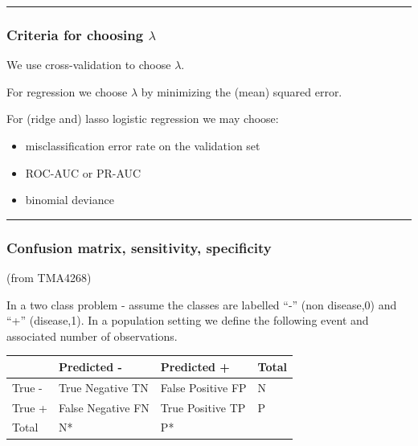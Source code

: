 \documentclass[
  letterpaper,
  DIV=11,
  numbers=noendperiod]{scrartcl}
\providecommand{\tightlist}{%
  \setlength{\itemsep}{0pt}\setlength{\parskip}{0pt}}\usepackage{longtable,booktabs,array}
\begin{document}
\begin{center}\rule{0.5\linewidth}{0.5pt}\end{center}

\hypertarget{criteria-for-choosing-lambda}{%
\subsubsection{\texorpdfstring{Criteria for choosing
\(\lambda\)}{Criteria for choosing \textbackslash lambda}}\label{criteria-for-choosing-lambda}}

We use cross-validation to choose \(\lambda\).

For regression we choose \(\lambda\) by minimizing the (mean) squared
error.

For (ridge and) lasso logistic regression we may choose:

\begin{itemize}
\tightlist
\item
  misclassification error rate on the validation set
\item
  ROC-AUC or PR-AUC
\item
  binomial deviance
\end{itemize}

\begin{center}\rule{0.5\linewidth}{0.5pt}\end{center}

\hypertarget{confusion-matrix-sensitivity-specificity}{%
\subsubsection{Confusion matrix, sensitivity,
specificity}\label{confusion-matrix-sensitivity-specificity}}

(from TMA4268)

In a two class problem - assume the classes are labelled ``-'' (non
disease,0) and ``+'' (disease,1). In a population setting we define the
following event and associated number of observations.

\begin{longtable}[]{@{}llll@{}}
\toprule()
& Predicted - & Predicted + & Total \\
\midrule()
\endhead
True - & True Negative TN & False Positive FP & N \\
True + & False Negative FN & True Positive TP & P \\
Total & N* & P* & \\
\bottomrule()
\end{longtable}
\end{document}
